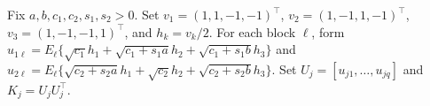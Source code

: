 Fix \(a,b,c_1,c_2,s_1,s_2>0\). Set \(v_1=(1,1,-1,-1)^\top\), \(v_2=(1,-1,1,-1)^\top\), \(v_3=(1,-1,-1,1)^\top\), and \(h_k=v_k/2\). For each block \(\ell\), form \(u_{1\ell}=E_\ell\{\sqrt{c_1}h_1+\sqrt{c_1+s_1a}h_2+\sqrt{c_1+s_1b}h_3\}\) and \(u_{2\ell}=E_\ell\{\sqrt{c_2+s_2a}h_1+\sqrt{c_2}h_2+\sqrt{c_2+s_2b}h_3\}\). Set \(U_j=[u_{j1},\ldots,u_{jq}]\) and \(K_j=U_jU_j^\top\).